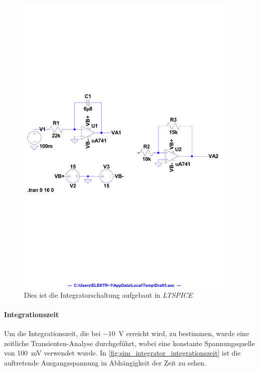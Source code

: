 \documentclass[12pt,english,ngerman]{scrartcl}
\begin{document}
\begin{figure}[H]
  \centering
    \includegraphics[width=0.95\textwidth]{./figures/integrator/sim/umkehr_int/schalt_umkehr_100mv.pdf}
  \caption{Dies ist die Integratorschaltung aufgebaut in \textit{LTSPICE}}
  \label{fig:sim_integrator_schaltung}
\end{figure}

\paragraph{Integrationszeit}
Um die Integrationszeit, die bei \SI{-10}{\volt} erreicht wird, zu bestimmen, wurde eine zeitliche 
Transienten-Analyse durchgeführt, wobei eine konstante Spannungsquelle von \SI{100}{\milli\volt} verwendet
wurde. In \autoref{fig:sim_integrator_integrationszeit} ist die auftretende Ausgangsspannung in
Abhängigkeit der Zeit zu sehen.
\end{document}
